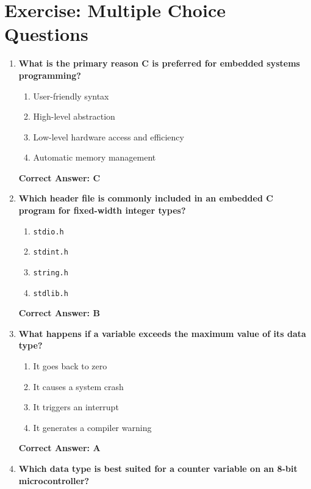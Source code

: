 \documentclass[
  9pt,
  letterpaper,
  abstract,
  titlepage]{scrbook}
\begin{document}
\section{Exercise: Multiple Choice
Questions}\label{exercise-multiple-choice-questions}

\begin{enumerate}
\def\labelenumi{\arabic{enumi}.}
\item
  \textbf{What is the primary reason C is preferred for embedded systems
  programming?}

  \begin{enumerate}
  \def\labelenumii{\arabic{enumii}.}
  \item
    User-friendly syntax
  \item
    High-level abstraction
  \item
    Low-level hardware access and efficiency
  \item
    Automatic memory management
  \end{enumerate}

  \textbf{Correct Answer: C}
\item
  \textbf{Which header file is commonly included in an embedded C
  program for fixed-width integer types?}

  \begin{enumerate}
  \def\labelenumii{\arabic{enumii}.}
  \item
    \texttt{stdio.h}
  \item
    \texttt{stdint.h}
  \item
    \texttt{string.h}
  \item
    \texttt{stdlib.h}
  \end{enumerate}

  \textbf{Correct Answer: B}
\item
  \textbf{What happens if a variable exceeds the maximum value of its
  data type?}

  \begin{enumerate}
  \def\labelenumii{\arabic{enumii}.}
  \item
    It goes back to zero
  \item
    It causes a system crash
  \item
    It triggers an interrupt
  \item
    It generates a compiler warning
  \end{enumerate}

  \textbf{Correct Answer: A}
\item
  \textbf{Which data type is best suited for a counter variable on an
  8-bit microcontroller?}


\end{enumerate}
\end{document}
